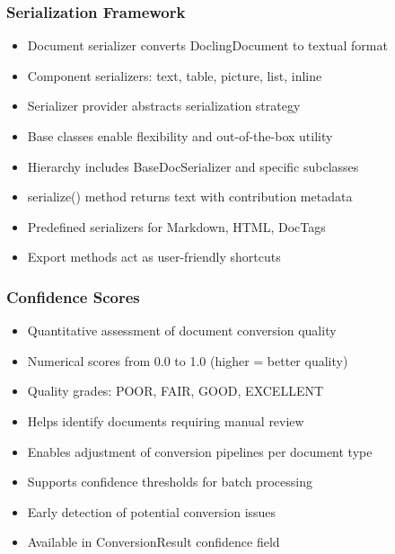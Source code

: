 \begin{frame}[fragile]\frametitle{Serialization Framework}
      \begin{itemize}
	\item Document serializer converts DoclingDocument to textual format
	\item Component serializers: text, table, picture, list, inline
	\item Serializer provider abstracts serialization strategy
	\item Base classes enable flexibility and out-of-the-box utility
	\item Hierarchy includes BaseDocSerializer and specific subclasses
	\item serialize() method returns text with contribution metadata
	\item Predefined serializers for Markdown, HTML, DocTags
	\item Export methods act as user-friendly shortcuts
	  \end{itemize}
\end{frame}

\begin{frame}[fragile]\frametitle{Confidence Scores}
      \begin{itemize}
	\item Quantitative assessment of document conversion quality
	\item Numerical scores from 0.0 to 1.0 (higher = better quality)
	\item Quality grades: POOR, FAIR, GOOD, EXCELLENT
	\item Helps identify documents requiring manual review
	\item Enables adjustment of conversion pipelines per document type
	\item Supports confidence thresholds for batch processing
	\item Early detection of potential conversion issues
	\item Available in ConversionResult confidence field
	  \end{itemize}
\end{frame}

